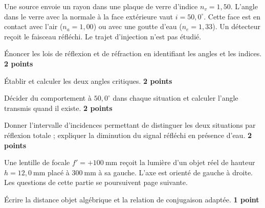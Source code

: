 \label{ex-DS}
Une source envoie un rayon dans une plaque de verre d'indice $n_v=1{,}50$. L'angle dans le verre avec la normale à la face extérieure vaut $i=50{,}0^\circ$. Cette face est en contact avec l'air ($n_a=1{,}00$) ou avec une goutte d'eau ($n_e=1{,}33$). Un détecteur reçoit le faisceau réfléchi. Le trajet d'injection n'est pas étudié.
\begin{questions}
\item Énoncer les lois de réflexion et de réfraction en identifiant les angles et les indices. \textbf{2 points}
\item Établir et calculer les deux angles critiques. \textbf{2 points}
\item Décider du comportement à $50{,}0^\circ$ dans chaque situation et calculer l'angle transmis quand il existe. \textbf{2 points}
\item Donner l'intervalle d'incidences permettant de distinguer les deux situations par réflexion totale ; expliquer la diminution du signal réfléchi en présence d'eau. \textbf{2 points}
\end{questions}
Une lentille de focale $f'=+100\ \mathrm{mm}$ reçoit la lumière d'un objet réel de hauteur $h=12{,}0\ \mathrm{mm}$ placé à $300\ \mathrm{mm}$ à sa gauche. L'axe est orienté de gauche à droite. Les questions de cette partie se poursuivent page suivante.
\begin{questions}
\item Écrire la distance objet algébrique et la relation de conjugaison adaptée. \textbf{1 point}
\end{questions}

